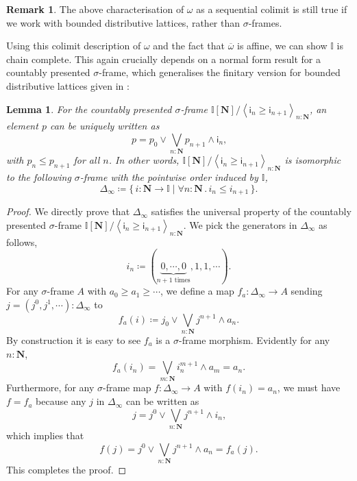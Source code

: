 \documentclass[a4paper,12pt]{amsart}
\newtheorem{lemma}[theorem]{Lemma}
\theoremstyle{definition}
\newtheorem{remark}[theorem]{Remark}
\newcommand{\mb}[1]{\mathbf{#1}}
\newcommand{\mbb}[1]{\mathbb{#1}}
\newcommand{\I}{\mbb I}
\newcommand{\ms}[1]{\mathsf{#1}}
\newcommand{\ov}[1]{\overline{#1}}
\newcommand{\pair}[1]{\left\langle#1\right\rangle}
\newcommand{\scomp}[2]{\{\,#1\mid#2\,\}}
\newcommand{\N}{\mb N}
\newcommand{\fa}[2]{\forall #1\!\colon\!\!#2\mathpunct{.}}
\begin{document}
\begin{remark}\label{rem:omegaalwayscolim}
  The above characterisation of $\omega$ as a sequential colimit is still true if we work with bounded distributive lattices, rather than $\sigma$-frames.
\end{remark}

Using this colimit description of $\omega$ and the fact that $\ov\omega$ is affine, we can show $\I$ is chain complete. This again crucially depends on a normal form result for a countably presented $\sigma$-frame, which generalises the finitary version for bounded distributive lattices given in :

\begin{lemma}\label{app:normalsigma}
  For the countably presented $\sigma$-frame $\I[\N]/\pair{\ms{i}_n \ge \ms{i}_{n+1}}_{n:\N}$, an element $p$ can be uniquely written as 
  \[ p = p_0 \vee \bigvee_{n:\N} p_{n+1} \wedge \ms{i}_n\text{,} \]
  with $p_n \le p_{n+1}$ for all $n$. In other words, $\I[\N]/\pair{\ms{i}_n \ge \ms{i}_{n+1}}_{n:\N}$ is isomorphic to the following $\sigma$-frame with the pointwise order induced by $\I$,
  \[ \Delta_\infty \coloneq \scomp{i : \N \to \I}{\fa n\N i_n \le i_{n+1}}\text{.} \]
\end{lemma}
\begin{proof}
  We directly prove that $\Delta_\infty$ satisfies the universal property of the countably presented $\sigma$-frame $\I[\N]/\pair{\ms{i}_n \ge \ms{i}_{n+1}}_{n:\N}$. We pick the generators in $\Delta_\infty$ as follows,
  \[ i_n \coloneq (\underbrace{0,\cdots,0}_{n+1 \text{ times}},1,1,\cdots)\text{.} \]
  For any $\sigma$-frame $A$ with $a_0 \ge a_1 \ge \cdots$, we define a map $f_a : \Delta_\infty \to A$ sending $j = (j^0,j^1,\cdots) : \Delta_\infty$ to
  \[ f_a(i) \coloneq j_0 \vee \bigvee_{n:\N} j^{n+1} \wedge a_{n}\text{.} \]
  By construction it is easy to see $f_a$ is a $\sigma$-frame morphism. Evidently for any $n : \N$, 
  \[ f_a(i_n) = \bigvee_{m:\N} i_n^{m+1} \wedge a_m = a_n\text{.} \]
  Furthermore, for any $\sigma$-frame map $f \colon \Delta_\infty \to A$ with $f(i_n) = a_n$, we must have $f = f_a$ because any $j$ in $\Delta_\infty$ can be written as
  \[ j = j^0 \vee \bigvee_{n:\N} j^{n+1} \wedge i_n\text{,} \]
  which implies that
  \[ f(j) = j^0 \vee \bigvee_{n:\N}j^{n+1} \wedge a_n = f_a(j)\text{.} \]
  This completes the proof.
\end{proof}

\end{document}
